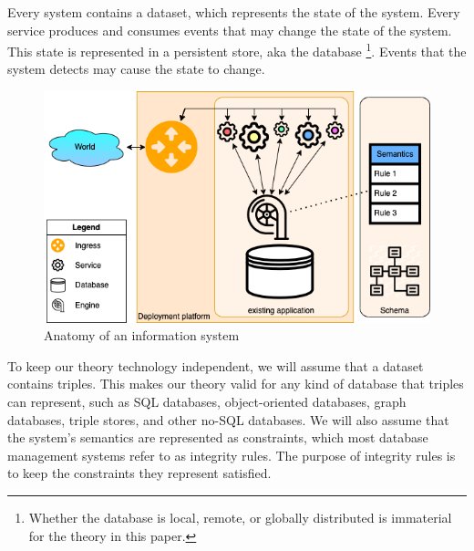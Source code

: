 \documentclass{elsarticle}
\begin{document}
   Every system contains a dataset, which represents the state of the system.
   Every service produces and consumes events that may change the state of the system.
   This state is represented in a persistent store, aka the database%
\footnote{Whether the database is local, remote, or globally distributed is immaterial for the theory in this paper.}.
   Events that the system detects may cause the state to change.
\begin{figure}[bht]
   \begin{center}
     \includegraphics[scale=.45]{datamigration-Pre-migration.drawio.png}
   \end{center}
\caption{Anatomy of an information system}
\label{fig:pre-migration}
\end{figure}
   To keep our theory technology independent, we will assume that a dataset contains triples.
   This makes our theory valid for any kind of database that triples can represent,
   such as SQL databases, object-oriented databases, graph databases, triple stores, and other no-SQL databases.
   We will also assume that the system's semantics are represented as constraints,
   which most database management systems refer to as integrity rules.
   The purpose of integrity rules is to keep the constraints they represent satisfied.
\end{document}

